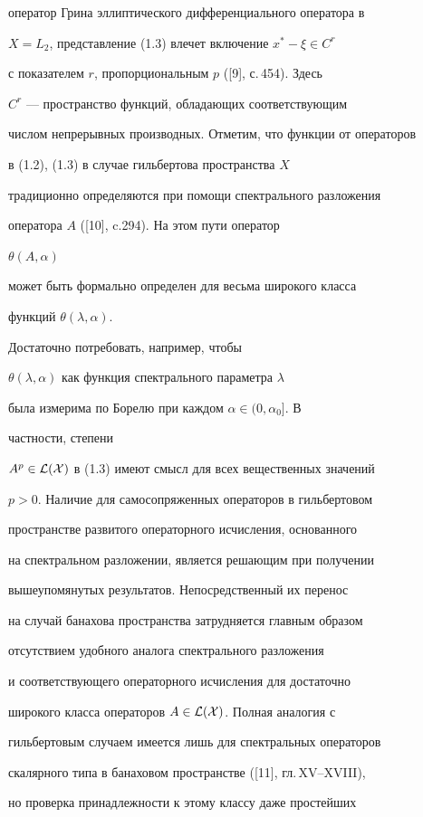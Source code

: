 оператор Грина эллиптического дифференциального оператора в 


$X=L_2$, представление (1.3) влечет включение $x^*-\xi\in C^r$ 


с показателем $r$, пропорциональным $p$ ([9], с.\,454). Здесь 


$C^r$ --- пространство функций, обладающих соответствующим 


числом непрерывных производных. Отметим, что функции от операторов 


в (1.2), (1.3) в случае гильбертова пространства $X$ 


традиционно определяются при помощи спектрального разложения 


оператора $A$ ([10], c.294). На этом пути оператор 


$\theta(A,\alpha)$ 


может быть формально определен для весьма широкого класса 


функций $\theta(\lambda,\alpha)$. 


Достаточно потребовать, например, чтобы 


$\theta(\lambda,\alpha)$ как функция спектрального параметра $\lambda$ 


была измерима по Борелю при каждом $\alpha\in(0,\alpha_0]$. В 


частности, степени 


$A^p\in\cal L(X)$ в (1.3) имеют смысл для всех вещественных значений 


$p>0$. Наличие для самосопряженных операторов в гильбертовом 


пространстве развитого операторного исчисления, основанного 


на спектральном разложении, является решающим при получении 


вышеупомянутых результатов. Непосредственный их перенос 


на случай банахова пространства затрудняется главным образом 


отсутствием удобного аналога спектрального разложения 


и соответствующего операторного исчисления для достаточно 


широкого класса операторов $A\in\cal L(X)$. Полная аналогия с 


гильбертовым случаем имеется лишь для спектральных операторов


скалярного типа в банаховом пространстве ([11], гл.\,XV--XVIII),


но проверка принадлежности к этому классу даже простейших 


